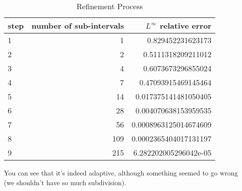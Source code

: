 \documentclass{article}
\begin{document}
\begin{table}[H]
    \centering
    \begin{tabular}{l|r|r}
        step & number of sub-intervals & $L^\infty$ relative error \\
        \hline
        1  &   1 & 0.829452231623173 \\
        2  &   2 & 0.5111318209211012 \\
        3  &   4 & 0.6073673296855024 \\
        4  &   7 & 0.47093915469145464 \\
        5  &  14 & 0.017375141481050405 \\
        6  &  28 & 0.004070638153959535 \\
        7  &  56 & 0.0008963125014674609 \\
        8  & 109 & 0.0002365404017131197 \\
        9  & 215 & 6.282202005296042e-05 \\
    \end{tabular}
    \caption{Refinement Process}
\end{table}

You can see that it's indeed adaptive, although something seemed to go wrong 
(we shouldn't have so much subdivision).
\end{document}
